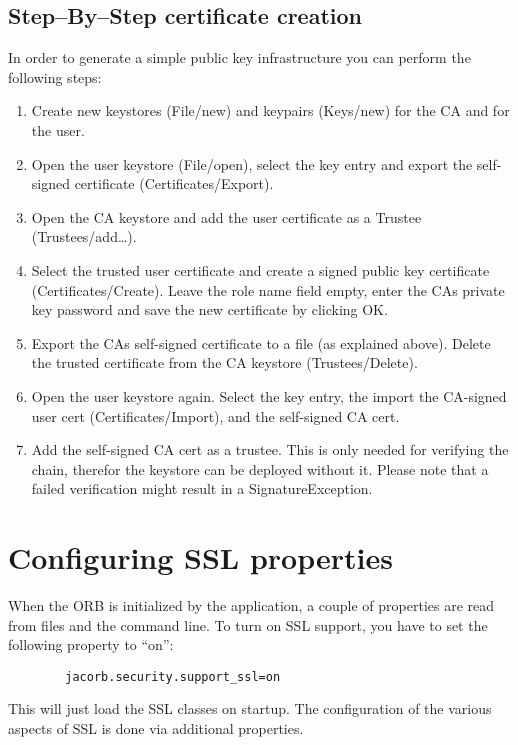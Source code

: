 \documentclass[12pt]{scrbook}
\begin{document}
\subsection{Step--By--Step certificate creation}
In  order to  generate  a  simple public  key  infrastructure you  can
perform the following steps:
\begin{enumerate}
\item Create new keystores (File/new) and keypairs (Keys/new) for the CA
and for the user.
\item  Open the  user keystore (File/open),  select the  key  entry and
export the self-signed certificate (Certificates/Export).
\item  Open  the  CA  keystore  and  add the  user  certificate  as  a
Trustee (Trustees/add\dots).
\item Select the  trusted user certificate and create  a signed public
key certificate (Certificates/Create). Leave the role name field empty,
enter the  CAs private  key password and  save the new  certificate by
clicking OK.
\item Export the  CAs self-signed certificate to a  file (as explained
above).    Delete    the    trusted    certificate   from    the    CA
keystore (Trustees/Delete).
\item Open the  user keystore again. Select the  key entry, the import
the CA-signed  user cert (Certificates/Import), and  the self-signed CA
cert.
\item Add  the self-signed CA cert  as a trustee. This  is only needed
for verifying the chain, therefor the keystore can be deployed without
it.  Please  note  that  a  failed  verification  might  result  in  a
SignatureException.
\end{enumerate}

\section{Configuring SSL properties}

When the ORB is initialized by the application, a couple of properties
are read from files and the  command line. To turn on SSL support, you have to
set the following property to ``on'':

\begin{verbatim}
        jacorb.security.support_ssl=on
\end{verbatim}

This will just load the SSL classes on startup. The configuration of the
various aspects of SSL is done via additional properties.
\end{document}
